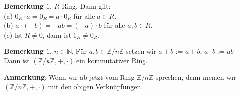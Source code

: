 \documentclass[10pt,a4paper,numbers=endperiod]{scrartcl}
\theoremstyle{definition}
\newtheorem{bem}[satz]{Bemerkung}
\begin{document}
\begin{bem}
	$R$ Ring. Dann gilt:\\
	(a) $0_R \cdot a = 0_R = a \cdot 0_R$ für alle $a \in R$.\\
	(b) $a \cdot (-b) = -ab = (-a) \cdot b$ für alle $a,b \in R$.\\
	(c) Ist $R \neq 0$, dann ist $1_R \neq 0_R$.  
\end{bem}

\begin{bem}
	$n \in \mathbb{N}$. Für $\overline{a}, \overline{b} \in \mathbb{Z}/n\mathbb{Z}$ setzen wir $\overline{a}+\overline{b}$ := $\overline{a+b}$, $\overline{a} \cdot \overline{b}$ := $\overline{ab}$\\
	Dann ist $(\mathbb{Z}/n\mathbb{Z},+,\cdot)$ ein kommutativer Ring. 
\end{bem}

\textbf{Anmerkung}: Wenn wir ab jetzt vom Ring $\mathbb{Z}/n\mathbb{Z}$ sprechen, dann meinen wir $(\mathbb{Z}/n\mathbb{Z},+,\cdot)$ mit den obigen Verknüpfungen. 
\end{document}
